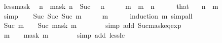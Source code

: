 \begin{isabellebody}
\endisatagproof
{\isafoldproof}%
%
\isadelimproof
\isanewline
%
\endisadelimproof
\isanewline
{}\isamarkupfalse%
\ less{\isacharunderscore}{\kern0pt}mask{\isacharcolon}{\kern0pt}\isanewline
\ \ {\isacartoucheopen}n\ {\isacharless}{\kern0pt}\ mask\ n{\isacartoucheclose}\ \ {\isacartoucheopen}Suc\ {}\ {\isacharless}{\kern0pt}\ n{\isacartoucheclose}\isanewline
%
\isadelimproof
%
\endisadelimproof
%
\isatagproof
{}\isamarkupfalse%
\ {\isacharminus}{\kern0pt}\isanewline
\ \ \isamarkupfalse%
\ m\ \ {\isacartoucheopen}m\ {\isacharequal}{\kern0pt}\ n\ {\isacharminus}{\kern0pt}\ {}{\isacartoucheclose}\isanewline
\ \ \isamarkupfalse%
\ that\ \isamarkupfalse%
\ {\isacharasterisk}{\kern0pt}{\isacharcolon}{\kern0pt}\ {\isacartoucheopen}n\ {\isacharequal}{\kern0pt}\ m\ {\isacharplus}{\kern0pt}\ {}{\isacartoucheclose}\isanewline
\ \ \ \ \isamarkupfalse%
\ simp\isanewline
\ \ \isamarkupfalse%
\ {\isacartoucheopen}Suc\ {\isacharparenleft}{\kern0pt}Suc\ {\isacharparenleft}{\kern0pt}Suc\ m{\isacharparenright}{\kern0pt}{\isacharparenright}{\kern0pt}\ {\isacharless}{\kern0pt}\ {}\ {\isacharasterisk}{\kern0pt}\ {}\ {\isacharcircum}{\kern0pt}\ m{\isacartoucheclose}\isanewline
\ \ \ \ \isamarkupfalse%
\ {\isacharparenleft}{\kern0pt}induction\ m{\isacharparenright}{\kern0pt}\ simp{\isacharunderscore}{\kern0pt}all\isanewline
\ \ \isamarkupfalse%
\ \isamarkupfalse%
\ {\isacartoucheopen}Suc\ {\isacharparenleft}{\kern0pt}m\ {\isacharplus}{\kern0pt}\ {}{\isacharparenright}{\kern0pt}\ {\isacharless}{\kern0pt}\ Suc\ {\isacharparenleft}{\kern0pt}mask\ {\isacharparenleft}{\kern0pt}m\ {\isacharplus}{\kern0pt}\ {}{\isacharparenright}{\kern0pt}{\isacharparenright}{\kern0pt}{\isacartoucheclose}\isanewline
\ \ \ \ \isamarkupfalse%
\ {\isacharparenleft}{\kern0pt}simp\ add{\isacharcolon}{\kern0pt}\ Suc{\isacharunderscore}{\kern0pt}mask{\isacharunderscore}{\kern0pt}eq{\isacharunderscore}{\kern0pt}exp{\isacharparenright}{\kern0pt}\isanewline
\ \ \isamarkupfalse%
\ \isamarkupfalse%
\ {\isacartoucheopen}m\ {\isacharplus}{\kern0pt}\ {}\ {\isacharless}{\kern0pt}\ mask\ {\isacharparenleft}{\kern0pt}m\ {\isacharplus}{\kern0pt}\ {}{\isacharparenright}{\kern0pt}{\isacartoucheclose}\isanewline
\ \ \ \ \isamarkupfalse%
\ {\isacharparenleft}{\kern0pt}simp\ add{\isacharcolon}{\kern0pt}\ less{\isacharunderscore}{\kern0pt}le{\isacharparenright}{\kern0pt}\isanewline

\end{isabellebody}
